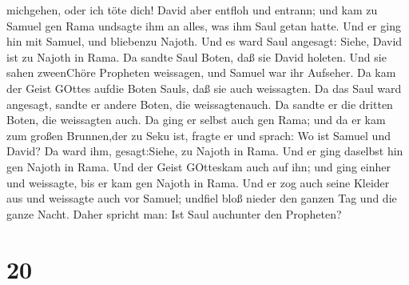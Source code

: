 michgehen, oder ich töte dich!  David aber entfloh und
entrann; und kam zu Samuel gen Rama undsagte ihm an alles, was ihm Saul
getan hatte. Und er ging hin mit Samuel, und bliebenzu Najoth.
 Und es ward Saul angesagt: Siehe, David ist zu Najoth in
Rama.  Da sandte Saul Boten, daß sie David holeten. Und sie
sahen zweenChöre Propheten weissagen, und Samuel war ihr Aufseher. Da
kam der Geist GOttes aufdie Boten Sauls, daß sie auch weissagten.
 Da das Saul ward angesagt, sandte er andere Boten, die
weissagtenauch. Da sandte er die dritten Boten, die weissagten auch.
 Da ging er selbst auch gen Rama; und da er kam zum großen
Brunnen,der zu Seku ist, fragte er und sprach: Wo ist Samuel und David?
Da ward ihm, gesagt:Siehe, zu Najoth in Rama.  Und er ging
daselbst hin gen Najoth in Rama. Und der Geist GOtteskam auch auf ihn;
und ging einher und weissagte, bis er kam gen Najoth in Rama.
 Und er zog auch seine Kleider aus und weissagte auch vor
Samuel; undfiel bloß nieder den ganzen Tag und die ganze Nacht. Daher
spricht man: Ist Saul auchunter den Propheten?

\hypertarget{section-19}{%
\section{20}\label{section-19}}

